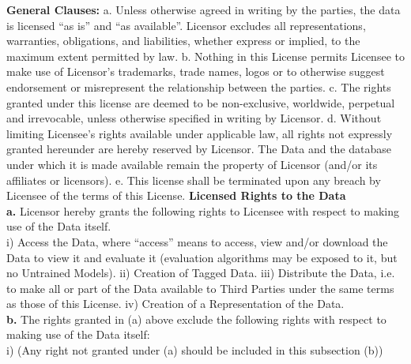 \documentclass{article} %
\begin{document}
\textbf{General Clauses:}
\newline
a. Unless otherwise agreed in writing by the parties, the data is licensed “as is” and “as available”. Licensor excludes all representations, warranties, obligations, and liabilities, whether express or implied, to the maximum extent permitted by law. 
\newline
b. Nothing in this License permits Licensee to make use of Licensor’s trademarks, trade names, logos or to otherwise suggest endorsement or misrepresent the relationship between the parties. 
\newline
c. The rights granted under this license are deemed to be non-exclusive, worldwide, perpetual and irrevocable, unless otherwise specified in writing by Licensor. 
\newline
d. Without limiting Licensee’s rights available under applicable law, all rights not expressly granted hereunder are hereby reserved by Licensor. The Data and the database under which it is made available remain the property of Licensor (and/or its affiliates or licensors).
\newline 
e. This license shall be terminated upon any breach by Licensee of the terms of this License. 
\newline
\textbf{Licensed Rights to the Data}
\newline
\\
\textbf{a.} Licensor hereby grants the following rights to Licensee with respect to making use of the Data itself.
\\
\newline
i) Access the Data, where “access” means to access, view and/or download the Data to view it and evaluate it (evaluation algorithms may be exposed to it, but no Untrained Models).
\newline
ii) Creation of Tagged Data.
\newline
iii) Distribute the Data, i.e. to make all or part of the Data available to Third Parties under the same terms as those of this License.
\newline
iv) Creation of a Representation of the Data.
\\
\newline
\textbf{b.} The rights granted in (a) above exclude the following rights with respect to making use of the Data itself:
\\
\newline
i) (Any right not granted under (a) should be included in this subsection (b))
\\
\end{document}
